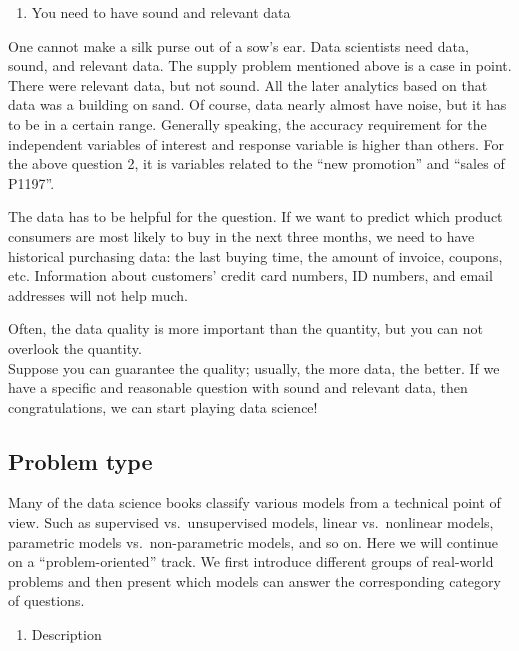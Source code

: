 \documentclass[
  12pt,
]{krantz}
\providecommand{\tightlist}{%
  \setlength{\itemsep}{0pt}\setlength{\parskip}{0pt}}
\begin{document}
\begin{enumerate}
\def\labelenumi{\arabic{enumi}.}
\setcounter{enumi}{1}
\tightlist
\item
  You need to have sound and relevant data
\end{enumerate}

One cannot make a silk purse out of a sow's ear. Data scientists need data, sound, and relevant data. The supply problem mentioned above is a case in point. There were relevant data, but not sound. All the later analytics based on that data was a building on sand. Of course, data nearly almost have noise, but it has to be in a certain range. Generally speaking, the accuracy requirement for the independent variables of interest and response variable is higher than others. For the above question 2, it is variables related to the ``new promotion'' and ``sales of P1197''.

The data has to be helpful for the question. If we want to predict which product consumers are most likely to buy in the next three months, we need to have historical purchasing data: the last buying time, the amount of invoice, coupons, etc. Information about customers' credit card numbers, ID numbers, and email addresses will not help much.

Often, the data quality is more important than the quantity, but you can not overlook the quantity.\\
Suppose you can guarantee the quality; usually, the more data, the better. If we have a specific and reasonable question with sound and relevant data, then congratulations, we can start playing data science!

\hypertarget{problem-type}{%
\subsection{Problem type}\label{problem-type}}

Many of the data science books classify various models from a technical point of view. Such as supervised vs.~unsupervised models, linear vs.~nonlinear models, parametric models vs.~non-parametric models, and so on. Here we will continue on a ``problem-oriented'' track. We first introduce different groups of real-world problems and then present which models can answer the corresponding category of questions.

\begin{enumerate}
\def\labelenumi{\arabic{enumi}.}
\tightlist
\item
  Description
\end{enumerate}
\end{document}
